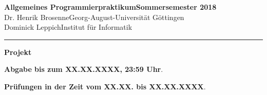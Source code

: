 \documentclass[12pt]{article}
\theoremstyle{plain}
\theoremstyle{definition}
\theoremstyle{remark}
\begin{document}
\textbf{Allgemeines Programmierpraktikum}\hfill \textbf{Sommersemester 2018} \\
Dr. Henrik Brosenne\hfill Georg-August-Universität Göttingen \\
Dominick Leppich\hfill Institut für Informatik\\
\medskip
\hrule
\bigskip
\begin{center}
{\Large \textbf{Projekt}}
\end{center} 
\bigskip
\textbf{Abgabe bis zum XX.XX.XXXX, 23:59 Uhr}. 

\textbf{Prüfungen in der Zeit vom XX.XX. bis XX.XX.XXXX}.

 \newpage
 \newpage

 \newpage
 \newpage

\end{document}
